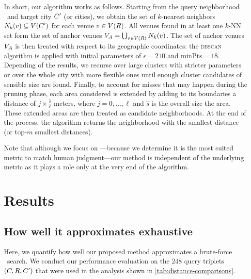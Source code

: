 In short, our algorithm works as follows. 
Starting from the query neighborhood \region\ and target city ${C}'$
(or cities), 
we obtain the set of $k$-nearest neighbors
${N}_k({v})\subseteq{V}({C}')$
for each venue ${v}\in{V}({R})$.
All venues found in at least one $k$-NN set form the set of anchor
venues 
${V}_A=\bigcup_{{v}\in{V}({R})}{N}_k({v})$.
The set of anchor venues ${V}_A$ is then treated with respect to its
geographic coordinates: the \textsc{dbscan} algorithm is applied with initial
parameters of $\epsilon=210$ and $\mathrm{minPts}=18$.
Depending of the results, we recurse over large clusters with
stricter parameters or over the whole city with more flexible ones until enough
cluster candidates of sensible size are found.
Finally, to account for misses that may happen during the pruning phase, each
area considered is extended by adding to its boundaries a distance of $j\times
\frac{\hat{s}}{\ell}$ meters, where $j=0,\ldots,\ell$ and $\hat{s}$ is the
overall size the area. These extended areas are then treated as candidate
neighborhoods. At the end of the process, the algorithm returns the
neighborhood with the smallest distance (or top-$m$ smallest distances).

Note that although we focus on \emd{}---because we determine it is the most
suited metric to match human judgment---our method is independent of the
underlying metric as it plays a role only at the very end of the algorithm.
\clearpage

\section{Results}
\label{sec:app-result}
\subsection{How well it approximates exhaustive \emd{}}


Here, we quantify how well our proposed method
approximates a brute-force \emd\ search. 
We conduct our performance evaluation on the $248$ query
triplets $({C}, {R}, {C}')$ that were used in the analysis
shown in \autoref{tab:distance-comparisons}.

